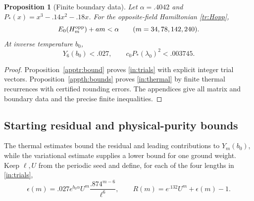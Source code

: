 \documentclass[11pt]{article}
\newtheorem{proposition}[theorem]{Proposition}
\theoremstyle{remark}
\numberwithin{equation}{section}
\begin{document}
\begin{proposition}[Finite boundary data]\label{in:finite}
Let $\alpha=.4042$ and $P_*(x)=x^3-.14x^2-.18x$. For the
opposite-field Hamiltonian \eqref{tr:Hopp},
\begin{equation}\label{in:trials}
 E_0(H_m^{\rm opp})+am<\alpha\qquad(m=34,78,142,240).
\end{equation}
At inverse temperature $b_0$,
\begin{equation}\label{in:thermal}
 Y_6(b_0)<.027,\qquad c_0P_*(\lambda_0)^2<.003745.
\end{equation}
\end{proposition}
\begin{proof}
Proposition~\ref{apptr:bound} proves \eqref{in:trials} with explicit
integer trial vectors. Proposition~\ref{appth:bounds} proves
\eqref{in:thermal} by finite thermal recurrences with certified
rounding errors. The appendices give all matrix and boundary data and
the precise finite inequalities.
\end{proof}

\subsection{Starting residual and physical-purity bounds}
The thermal estimates bound the residual and leading contributions to
$Y_m(b_0)$, while the variational estimate supplies a lower bound for
one ground weight.
Keep $\ell,U$ from the periodic seed and define, for each of the four
lengths in \eqref{in:trials},
\begin{equation}\label{in:epsR}
 \epsilon(m)=.027e^{b_0\alpha}U^m\frac{.874^{m-6}}{\ell^6},
 \qquad R(m)=e^{.132}U^m+\epsilon(m)-1.
\end{equation}
\end{document}
